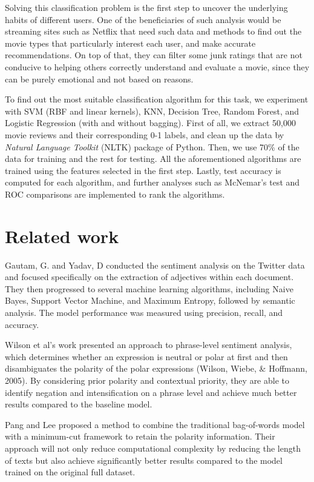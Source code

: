 \documentclass[10pt,twocolumn,letterpage]{article}
\begin{document}
	Solving this classification problem is the first step to uncover the underlying habits of different users. One of the beneficiaries of such analysis would be streaming sites such as Netflix that need such data and methods to find out the movie types that particularly interest each user, and make accurate recommendations. On top of that, they can filter some junk ratings that are not conducive to helping others correctly understand and evaluate a movie, since they can be purely emotional and not based on reasons. 
	
	To find out the most suitable classification algorithm for this task, we experiment with SVM (RBF and linear kernels), KNN, Decision Tree, Random Forest, and Logistic Regression (with and without bagging). First of all, we extract 50,000 movie reviews and their corresponding 0-1 labels, and clean up the data by \textit{Natural Language Toolkit} (NLTK) package of Python. Then, we use 70\% of the data for training and the rest for testing. All the aforementioned algorithms are trained using the features selected in the first step. Lastly, test accuracy is computed for each algorithm, and further analyses such as McNemar's test and ROC comparisons are implemented to rank the algorithms.
	\section{Related work}
	Gautam, G. and Yadav, D conducted the sentiment analysis on the Twitter data and focused specifically on the extraction of adjectives within each document. They then progressed to several machine learning algorithms, including Naive Bayes, Support Vector Machine, and Maximum Entropy, followed by semantic analysis. The model performance was measured using precision, recall, and accuracy.
	
	Wilson et al’s work presented an approach to phrase-level sentiment analysis, which determines whether an expression is neutral or polar at first and then disambiguates the polarity of the polar expressions (Wilson, Wiebe, \& Hoffmann, 2005).  By considering prior polarity and contextual priority, they are able to identify negation and intensification on a phrase level and achieve much better results compared to the baseline model.
	
	Pang and Lee proposed a method to combine the traditional bag-of-words model with a minimum-cut framework to retain the polarity information. Their approach will not only reduce computational complexity by reducing the length of texts but also achieve significantly better results compared to the model trained on the original full dataset. 
	
\end{document}
